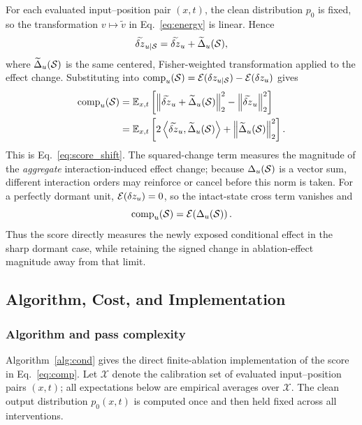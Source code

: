 For each evaluated input--position pair $(x,t)$, the clean distribution $p_0$ is fixed, so the transformation $v\mapsto\widetilde v$ in Eq.~\ref{eq:energy} is linear. Hence
\begin{equation}
\widetilde{\delta z}_{u\mid\mathcal{S}}=\widetilde{\delta z}_u+\widetilde{\Delta}_u(\mathcal{S}),
\label{eq:app_tilde_delta}
\end{equation}
where $\widetilde{\Delta}_u(\mathcal{S})$ is the same centered, Fisher-weighted transformation applied to the effect change.
Substituting into $\mathrm{comp}_u(\mathcal{S})=\mathcal{E}(\delta z_{u\mid\mathcal{S}})-\mathcal{E}(\delta z_u)$ gives
\begin{equation}
\begin{aligned}
\mathrm{comp}_u(\mathcal{S})
&=\mathbb{E}_{x,t}\left[\left\|\widetilde{\delta z}_u+\widetilde{\Delta}_u(\mathcal{S})\right\|_2^2-\left\|\widetilde{\delta z}_u\right\|_2^2\right]\\
&=\mathbb{E}_{x,t}\left[2\left\langle\widetilde{\delta z}_u,\widetilde{\Delta}_u(\mathcal{S})\right\rangle+\left\|\widetilde{\Delta}_u(\mathcal{S})\right\|_2^2\right].
\end{aligned}
\label{eq:app_score_decomposition}
\end{equation}
This is Eq.~\ref{eq:score_shift}. The squared-change term measures the magnitude of the \emph{aggregate} interaction-induced effect change; because $\Delta_u(\mathcal{S})$ is a vector sum, different interaction orders may reinforce or cancel before this norm is taken. For a perfectly dormant unit, $\mathcal{E}(\delta z_u)=0$, so the intact-state cross term vanishes and
\begin{equation}
\mathrm{comp}_u(\mathcal{S})=\mathcal{E}\!\left(\Delta_u(\mathcal{S})\right).
\label{eq:app_dormant_growth}
\end{equation}
Thus the score directly measures the newly exposed conditional effect in the sharp dormant case, while retaining the signed change in ablation-effect magnitude away from that limit.

\subsection{Algorithm, Cost, and Implementation}
\label{app:algorithm}

\subsubsection{Algorithm and pass complexity}

Algorithm~\ref{alg:cond} gives the direct finite-ablation implementation of the \coax score in Eq.~\ref{eq:comp}.
Let $\mathcal{X}$ denote the calibration set of evaluated input--position pairs
$(x,t)$; all expectations below are empirical averages over $\mathcal{X}$.
The clean output distribution $p_0(x,t)$ is computed once and then held fixed
across all interventions.

